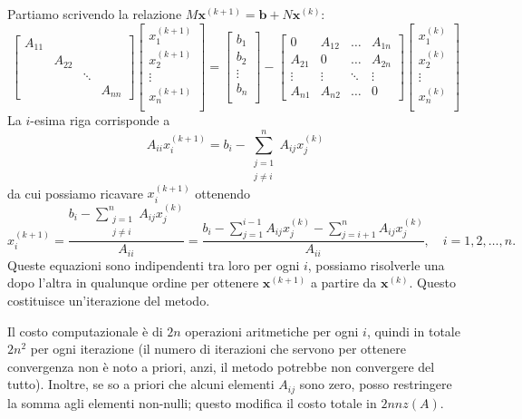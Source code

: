 \documentclass[a4paper]{report}
\theoremstyle{definiton}
\theoremstyle{remark}
\newcommand{\x}{\mathbf{x}}
\renewcommand{\b}{\mathbf{b}}
\begin{document}
Partiamo scrivendo la relazione $M\x^{(k+1)} = \b + N\x^{(k)}$:
\[
\begin{bmatrix}
    A_{11}\\
    & A_{22}\\
    & & \ddots \\
    & & & A_{nn}
\end{bmatrix}
\begin{bmatrix}
    x_1^{(k+1)}\\
    x_2^{(k+1)}\\
    \vdots\\
    x_n^{(k+1)}\\
\end{bmatrix}
=
\begin{bmatrix}
    b_1\\
    b_2\\
    \vdots\\
    b_n\\
\end{bmatrix}
-
\begin{bmatrix}
    0 & A_{12} & \dots & A_{1n}\\
    A_{21} & 0 & \dots & A_{2n}\\
    \vdots & \vdots & \ddots & \vdots\\
    A_{n1} & A_{n2} & \dots & 0
\end{bmatrix}
\begin{bmatrix}
    x_1^{(k)}\\
    x_2^{(k)}\\
    \vdots \\
    x_n^{(k)}\\
\end{bmatrix}
\]
La $i$-esima riga corrisponde a
\[
A_{ii}x_i^{(k+1)} = b_i - \sum_{\substack{j=1\\ j \neq i}}^n A_{ij}x_j^{(k)}
\]
da cui possiamo ricavare $x_i^{(k+1)}$ ottenendo
\[
x_i^{(k+1)} = \frac{b_i - \sum_{\substack{j=1\\ j \neq i}}^n A_{ij}x_j^{(k)}}{A_{ii}} = \frac{b_i - \sum_{j=1}^{i-1} A_{ij}x_j^{(k)} - \sum_{j=i+1}^n A_{ij}x_j^{(k)} }{A_{ii}}, \quad i=1,2,\dots,n.
\]
Queste equazioni sono indipendenti tra loro per ogni $i$, possiamo risolverle una dopo l'altra in qualunque ordine per ottenere $\x^{(k+1)}$ a partire da $\x^{(k)}$. Questo costituisce un'iterazione del metodo.

Il costo computazionale è di $2n$ operazioni aritmetiche per ogni $i$, quindi in totale $2n^2$ per ogni iterazione (il numero di iterazioni che servono per ottenere convergenza non è noto a priori, anzi, il metodo potrebbe non convergere del tutto). Inoltre, se so a priori che alcuni elementi $A_{ij}$ sono zero, posso restringere la somma agli elementi non-nulli; questo modifica il costo totale in $2nnz(A)$.
\end{document}

